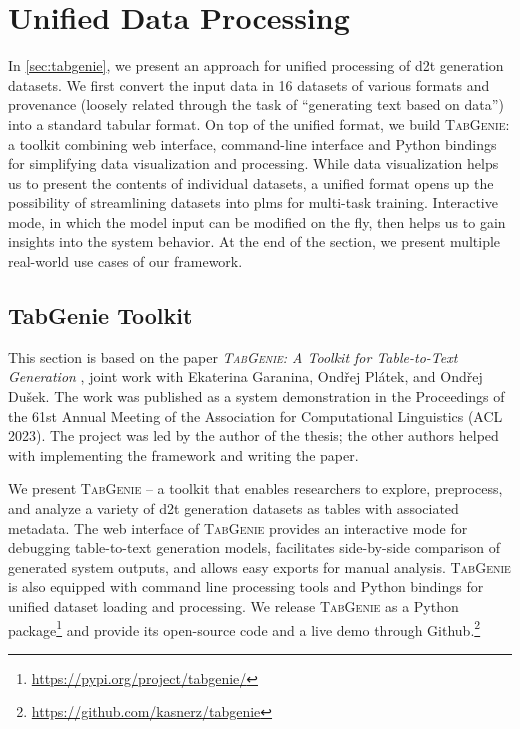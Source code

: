 
\chapter{Unified Data Processing}
\label{chap:tabgenie}

In \autoref{sec:tabgenie}, we present an approach for unified processing of \ac{d2t} generation datasets. We first convert the input data in 16 datasets of various formats and provenance (loosely related through the task of ``generating text based on data'') into a standard tabular format. On top of the unified format, we build \textsc{TabGenie}: a toolkit combining web interface, command-line interface and Python bindings for simplifying data visualization and processing. While data visualization helps us to present the contents of individual datasets, a unified format opens up the possibility of streamlining datasets into \acp{plm} for multi-task training. Interactive mode, in which the model input can be modified on the fly, then helps us to gain insights into the system behavior. At the end of the section, we present multiple real-world use cases of our framework.


\section{TabGenie Toolkit}
\label{sec:tabgenie}

\begin{refbox}
    This section is based on the paper \emph{\textsc{TabGenie}: A Toolkit for Table-to-Text Generation} \cite{kasnerTabGenieToolkitTabletoText2023}, joint work with Ekaterina Garanina, Ondřej Plátek, and Ondřej Dušek. The work was published as a system demonstration in the Proceedings of the 61st Annual Meeting of the Association for Computational Linguistics (ACL 2023). The project was led by the author of the thesis; the other authors helped with implementing the framework and writing the paper.
\end{refbox}


We present \textsc{TabGenie} -- a toolkit that enables researchers to explore, preprocess, and analyze a variety of \ac{d2t} generation datasets as tables with associated metadata. The web interface of \textsc{TabGenie} provides an interactive mode for debugging table-to-text generation models, facilitates side-by-side comparison of generated system outputs, and allows easy exports for manual analysis. \textsc{TabGenie} is also equipped with command line processing tools and Python bindings for unified dataset loading and processing. We release \textsc{TabGenie} as a Python package\footnote{\url{https://pypi.org/project/tabgenie/}} and provide its open-source code and a live demo through Github.\footnote{\url{https://github.com/kasnerz/tabgenie}}

